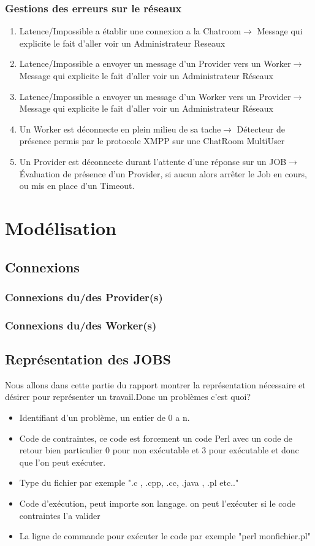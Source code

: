 \documentclass[11pt]{report}
\begin{document}
\subsection{Gestions des erreurs sur le réseaux}
\begin{enumerate}
\item Latence/Impossible a établir une  connexion a la Chatroom$ \rightarrow $ Message qui explicite le fait d’aller voir un Administrateur Reseaux
\item Latence/Impossible a envoyer un  message d'un Provider vers un Worker$ \rightarrow $ Message qui explicite le fait d’aller voir un Administrateur Réseaux
\item Latence/Impossible a envoyer un  message d'un Worker vers un Provider$ \rightarrow $ Message qui explicite le fait d’aller voir un Administrateur Réseaux 
\item Un Worker est déconnecte en plein milieu de sa tache$ \rightarrow $ Détecteur de présence permis par le protocole XMPP sur une ChatRoom MultiUser
\item Un Provider est déconnecte durant l'attente d'une réponse sur un JOB$ \rightarrow $ Évaluation de présence d'un Provider, si aucun alors arrêter le Job en cours, ou mis en place d'un Timeout.
\end{enumerate}

\newpage
\chapter{Modélisation}
\section{Connexions} 
\subsection{Connexions du/des Provider(s)} 
\subsection{Connexions du/des Worker(s)} 
\newpage
\section{Représentation des JOBS}
Nous allons dans cette partie du rapport montrer la représentation nécessaire et désirer pour représenter un travail.Donc un problèmes c'est quoi? 

\begin{itemize}
\item Identifiant d'un problème, un entier de 0 a n.
\item Code de contraintes, ce code est forcement un code Perl avec un code de retour bien particulier 0 pour non exécutable  et 3 pour exécutable et donc que l'on peut exécuter. 
\item Type du fichier par exemple ".c , .cpp, .cc, .java , .pl etc.."
\item Code d’exécution, peut importe son langage. on peut l'exécuter si le code contraintes l'a valider 
\item La ligne de commande pour exécuter le code par exemple "perl monfichier.pl"
\end{itemize}
\end{document}
